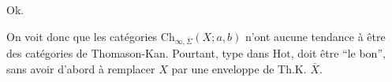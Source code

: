 Ok.

On voit donc que les catégories $\mathrm{Ch}_{\infty,\overline\Sigma}(X;a,b)$ n'ont aucune tendance à être des catégories de Thomason-Kan. Pourtant,  type dans $\mathrm{Hot}$, doit être ``le bon'', sans avoir d'abord à remplacer $X$ par une enveloppe de Th.K. $\overline X$.

